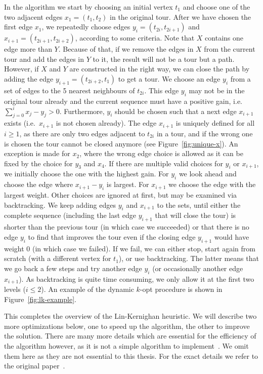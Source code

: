 \documentclass[12pt]{article}
\begin{document}
    In the algorithm we start by choosing an initial vertex $t_1$ and choose one of the two
    adjacent edges $x_1 = (t_1, t_2)$ in the original tour.
    After we have chosen the first edge $x_1$, we repeatedly choose edges $y_i = (t_{2i}, t_{2i+1})$
    and $x_{i+1} = (t_{2i+1}, t_{2i+2})$, according to some criteria.
    Note that $X$ contains one edge more than $Y$. Because of that, if we remove the edges in $X$
    from the current tour and add the edges in $Y$ to it, the result will not be a tour but a path.
    However, if $X$ and $Y$ are constructed in the right way, we can close the path by adding the
    edge $y_{i+1} = (t_{2i+2}, t_1)$ to get a tour.
    We choose an edge $y_i$ from a set of edges to the 5 nearest neighbours of $t_{2i}$. This edge
    $y_i$ may not be in the original tour already and the current sequence must have a positive
    gain, i.e.\ $\sum_{j=0}^i x_j - y_j > 0$. Furthermore, $y_i$ should be chosen such that a next
    edge $x_{i+1}$ exists (i.e.\ $x_{i+1}$ is not chosen already).
    The edge $x_{i+1}$ is uniquely defined for all $i \geq 1$, as there are only two edges adjacent
    to $t_{2i}$ in a tour, and if the wrong one is chosen the tour cannot be closed anymore (see
    Figure~\ref{fig:unique-x}).
    An exception is made for $x_2$, where the wrong edge choice is allowed as it can be fixed by
    the choice for $y_3$ and $x_4$.
    If there are multiple valid choices for $y_i$ or $x_{i+1}$, we initially choose the one with the
    highest gain. For $y_i$ we look ahead and choose the edge where $x_{i+1} - y_i$ is largest.
    For $x_{i+1}$ we choose the edge with the largest weight. Other choices are ignored at first,
    but may be examined via backtracking.
    We keep adding edges $y_i$ and $x_{i+1}$ to the sets, until either the complete sequence
    (including the last edge $y_{i+1}$ that will close the tour) is shorter than the previous tour
    (in which case we succeeded) or that there is no edge $y_i$ to find that improves the tour even
    if the closing edge $y_{i+1}$ would have weight 0 (in which case we failed).
    If we fail, we can either stop, start again from scratch (with a different vertex for $t_1$), or
    use backtracking. The latter means that we go back a few steps and try another edge $y_i$ (or
    occasionally another edge $x_{i+1}$).
    As backtracking is quite time consuming, we only allow it at the first two levels ($i \leq 2$).
    An example of the dynamic $k$-opt procedure is shown in Figure~\ref{fig:lk-example}.

    This completes the overview of the Lin-Kernighan heuristic. We will describe two more
    optimizations below, one to speed up the algorithm, the other to improve the solution. There are
    many more details which are essential for the efficiency of the algorithm however, as it is not
    a simple algorithm to implement~\cite{lkh1}. We omit them here as they are not essential to this
    thesis. For the exact details we refer to the original paper~\cite{lin-kernighan}.
\end{document}
